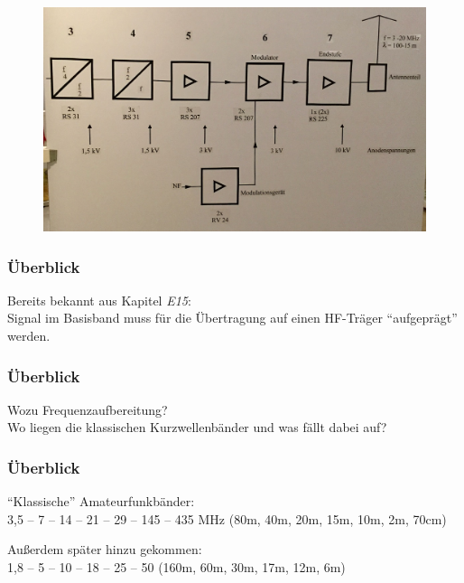 \begin{frame}
  \begin{center}
    \begin{figure}
      \includegraphics[width=1\textwidth,height=.9\textheight,keepaspectratio]{e15/Blockschaltbild_Runfunksender_Zeesen.jpg}
    \end{figure}
  \end{center}
\end{frame}

\begin{frame}
  \frametitle{Überblick}

  Bereits bekannt aus Kapitel \emph{E15}: \\[2em]

  Signal im Basisband muss für die Übertragung auf einen HF-Träger
  ``aufgeprägt'' werden.
\end{frame}

\begin{frame}
  \frametitle{Überblick}

  Wozu Frequenzaufbereitung?\\[2em]
  Wo liegen die klassischen Kurzwellenbänder und
  was fällt dabei auf?

\end{frame}

\begin{frame}
  \frametitle{Überblick}

  ``Klassische'' Amateurfunkbänder: \\[2em]

  3,5 -- 7 -- 14 -- 21 -- 29 -- 145 -- 435 MHz (80m, 40m, 20m, 15m, 10m, 2m, 70cm)

  \vspace{3em}

  Außerdem später hinzu gekommen: \\[2em]

  1,8 -- 5 -- 10 -- 18 -- 25 -- 50 (160m, 60m, 30m, 17m, 12m, 6m)


\end{frame}

